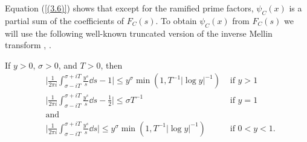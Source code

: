 \documentclass[./main]{subfiles}
\begin{document}
Equation (\ref{(3.6)}) shows that except for the ramified prime factors, $\psi_C(x)$ is a partial sum of the coefficients of $F_C(s)$. To obtain $\psi_C(x)$ from $F_C(s)$ we will use the following well-known truncated version of the inverse Mellin transform \cite[pp. 60--61]{14-titchmarsh1986theory}, \cite[pp. 105--106]{2-davenport2013multiplicative}.

\begin{lemma} \label{3.1}
If $y>0$, $\sigma>0$, and $T>0$, then \begin{align*}
    &\bigg| \frac{1}{2 \pi i} \int_{\sigma-iT}^{\sigma+iT} \frac{y^s}{s}\dd s-1 \bigg| \le y^\sigma \min(1, T^{-1}|\log y|^{-1}) &\text{ if } y>1 \\
     &\bigg| \frac{1}{2 \pi i} \int_{\sigma-iT}^{\sigma+iT} \frac{y^s}{s}\dd s-\frac{1}{2} \bigg| \le \sigma T^{-1}& \text{ if } y=1 \\
    &\text{and} &\\
     &\bigg| \frac{1}{2 \pi i} \int_{\sigma-iT}^{\sigma+iT} \frac{y^s}{s}\dd s\bigg| \le y^\sigma \min(1, T^{-1}|\log y|^{-1})&\text{ if } 0<y<1.
\end{align*}
\end{lemma}
\end{document}
